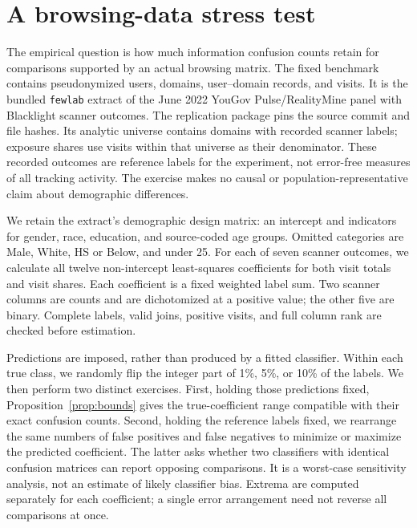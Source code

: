 \section{A browsing-data stress test}\label{sec:benchmark}
The empirical question is how much information confusion counts retain for
comparisons supported by an actual browsing matrix. The fixed benchmark contains
\BenchmarkUsers{} pseudonymized users, \BenchmarkDomains{} domains,
\BenchmarkRecords{} user--domain records, and \BenchmarkVisits{} visits.
It is the bundled \texttt{fewlab} extract of the June 2022 YouGov Pulse/RealityMine
panel with Blacklight scanner outcomes. The replication package pins the source
commit and file hashes. Its analytic universe contains domains with recorded
scanner labels; exposure shares use visits within that universe as their
denominator. These recorded outcomes are reference labels for the experiment,
not error-free measures of all tracking activity. The exercise makes no causal
or population-representative claim about demographic differences.

We retain the extract's demographic design matrix: an intercept and indicators
for gender, race, education, and source-coded age groups. Omitted categories are Male, White,
HS or Below, and under 25. For each of seven scanner outcomes, we
calculate all twelve non-intercept least-squares coefficients for both visit
totals and visit shares. Each coefficient is a fixed weighted label sum.
Two scanner columns are counts and are dichotomized at a positive value; the
other five are binary. Complete labels, valid joins, positive visits, and full
column rank are checked before estimation.

Predictions are imposed, rather than produced by a fitted classifier. Within
each true class, we randomly flip the integer part of 1\%, 5\%, or 10\% of the
labels. We then perform two distinct exercises. First, holding those predictions
fixed, Proposition~\ref{prop:bounds} gives the true-coefficient range compatible
with their exact confusion counts. Second, holding the reference labels fixed,
we rearrange the same numbers of false positives and false negatives to minimize
or maximize the predicted coefficient. The latter asks whether two classifiers
with identical confusion matrices can report opposing comparisons. It is a
worst-case sensitivity analysis, not an estimate of likely classifier bias.
Extrema are computed separately for each coefficient; a single error arrangement
need not reverse all comparisons at once.

